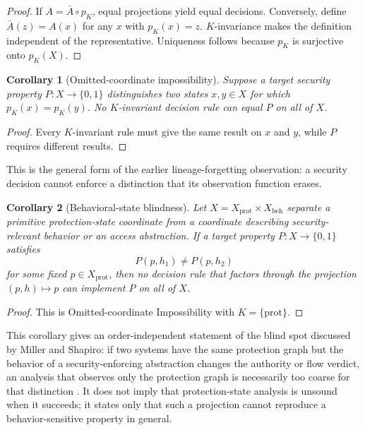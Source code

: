 \documentclass[10pt,twocolumn]{article}
\newtheorem{corollary}{Corollary}
\begin{document}
\begin{proof}
If $A=\bar A\circ p_K$, equal projections yield equal decisions.  Conversely,
define $\bar A(z)=A(x)$ for any $x$ with $p_K(x)=z$.  $K$-invariance makes the
definition independent of the representative.  Uniqueness follows because
$p_K$ is surjective onto $p_K(X)$.
\end{proof}

\begin{corollary}[Omitted-coordinate impossibility]
Suppose a target security property $P:X\to\{0,1\}$ distinguishes two states
$x,y\in X$ for which $p_K(x)=p_K(y)$.  No $K$-invariant decision rule can equal
$P$ on all of $X$.
\end{corollary}

\begin{proof}
Every $K$-invariant rule must give the same result on $x$ and $y$, while $P$
requires different results.
\end{proof}

This is the general form of the earlier lineage-forgetting observation: a
security decision cannot enforce a distinction that its observation function
erases.

\begin{corollary}[Behavioral-state blindness]\label{cor:behavioral-blindness}
Let $X=X_{\mathrm{prot}}\times X_{\mathrm{beh}}$ separate a primitive
protection-state coordinate from a coordinate describing security-relevant
behavior or an access abstraction.  If a target property $P:X\to\{0,1\}$
satisfies
\begin{equation}
  P(p,h_1)\ne P(p,h_2)
\end{equation}
for some fixed $p\in X_{\mathrm{prot}}$, then no decision rule that factors
through the projection $(p,h)\mapsto p$ can implement $P$ on all of $X$.
\end{corollary}

\begin{proof}
This is Omitted-coordinate Impossibility with
$K=\{\mathrm{prot}\}$.
\end{proof}

This corollary gives an order-independent statement of the blind spot discussed
by Miller and Shapiro: if two systems have the same protection graph but the
behavior of a security-enforcing abstraction changes the authority or flow
verdict, an analysis that observes only the protection graph is necessarily too
coarse for that distinction \cite{miller_shapiro2003}.  It does not imply that
protection-state analysis is unsound when it succeeds; it states only that such
a projection cannot reproduce a behavior-sensitive property in general.
\end{document}
